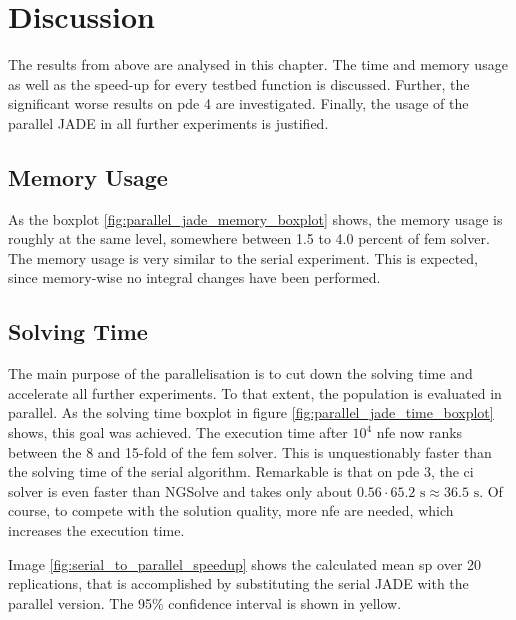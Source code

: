 \documentclass[./\jobname.tex]{subfiles}
\begin{document}
\section{Discussion}

The results from above are analysed in this chapter. The time and memory usage as well as the speed-up for every testbed function is discussed. Further, the significant worse results on \gls{pde} 4 are investigated. Finally, the usage of the parallel JADE in all further experiments is justified. 

\subsection{Memory Usage}
As the boxplot \ref{fig:parallel_jade_memory_boxplot} shows, the memory usage is roughly at the same level, somewhere between 1.5 to 4.0 percent of \gls{fem} solver. The memory usage is very similar to the serial experiment. This is expected, since memory-wise no integral changes have been performed.  

\subsection{Solving Time}
The main purpose of the parallelisation is to cut down the solving time and accelerate all further experiments. To that extent, the population is evaluated in parallel. As the solving time boxplot in figure \ref{fig:parallel_jade_time_boxplot} shows, this goal was achieved. The execution time after $10^4$ \gls{nfe} now ranks between the 8 and 15-fold of the \gls{fem} solver. This is unquestionably faster than the solving time of the serial algorithm. Remarkable is that on \gls{pde} 3, the \gls{ci} solver is even faster than NGSolve and takes only about $0.56 \cdot 65.2 \text{ s} \approx 36.5 \text{ s}$. Of course, to compete with the solution quality, more \gls{nfe} are needed, which increases the execution time. 

Image \ref{fig:serial_to_parallel_speedup} shows the calculated mean \gls{sp} over 20 replications, that is accomplished by substituting the serial JADE with the parallel version. The 95\% confidence interval is shown in yellow. 
\end{document}
